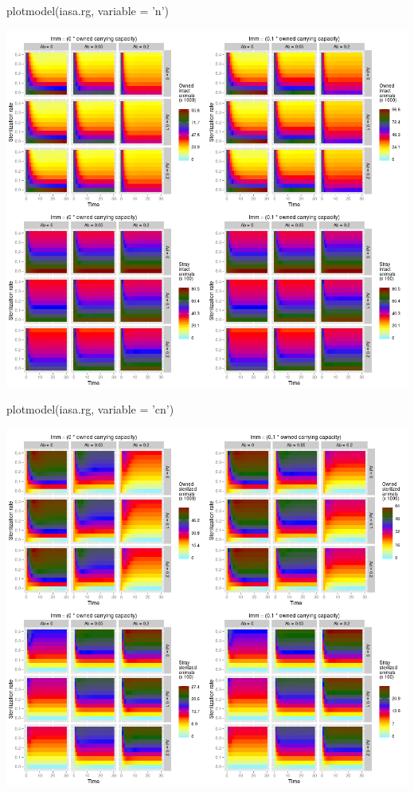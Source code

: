 \documentclass[a4paper]{article}
\begin{document}
plotmodel(iasa.rg, variable = 'n')

\begin{center}
\includegraphics[scale=.9]{iasa_n.png}
\end{center}

plotmodel(iasa.rg, variable = 'cn')

\begin{center}
\includegraphics[scale=.9]{iasa_cn.png}
\end{center}
\end{document}

